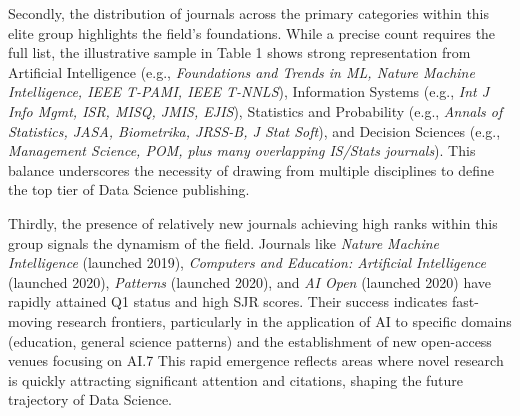 \documentclass[../main.tex]{subfiles}
\begin{document}
\vspace{0.2cm}
\noindent
Secondly, the distribution of journals across the primary categories within this elite group highlights the field's foundations. While a precise count requires the full list, the illustrative sample in Table 1 shows strong representation from Artificial Intelligence (e.g.,  \textit{Foundations and Trends in ML, Nature Machine Intelligence, IEEE T-PAMI, IEEE T-NNLS}), Information Systems (e.g.,  \textit{Int J Info Mgmt, ISR, MISQ, JMIS, EJIS}), Statistics and Probability (e.g.,  \textit{Annals of Statistics, JASA, Biometrika, JRSS-B, J Stat Soft}), and Decision Sciences (e.g.,  \textit{Management Science, POM, plus many overlapping IS/Stats journals}). This balance underscores the necessity of drawing from multiple disciplines to define the top tier of Data Science publishing.

\vspace{0.2cm}
\noindent
Thirdly, the presence of relatively new journals achieving high ranks within this group signals the dynamism of the field. Journals like  \textit{Nature Machine Intelligence} (launched 2019),  \textit{Computers and Education: Artificial Intelligence} (launched 2020),  \textit{Patterns} (launched 2020), and  \textit{AI Open} (launched 2020) have rapidly attained Q1 status and high SJR scores. Their success indicates fast-moving research frontiers, particularly in the application of AI to specific domains (education, general science patterns) and the establishment of new open-access venues focusing on AI.7 This rapid emergence reflects areas where novel research is quickly attracting significant attention and citations, shaping the future trajectory of Data Science.
\end{document}
